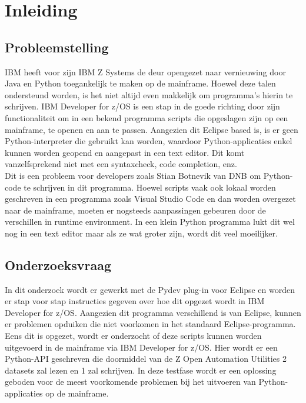 
\chapter{Inleiding}%
\label{ch:inleiding}

\section{Probleemstelling}%
\label{sec:probleemstelling}
IBM heeft voor zijn IBM Z Systems de deur opengezet naar vernieuwing door Java en Python toegankelijk te maken op de mainframe. Hoewel deze talen ondersteund worden, is het niet altijd even makkelijk om programma's hierin te schrijven. IBM Developer for z/OS is een stap in de goede richting door zijn functionaliteit om in een bekend programma scripts die opgeslagen zijn op een mainframe, te openen en aan te passen. Aangezien dit Eclipse based is, is er geen Python-interpreter die gebruikt kan worden, waardoor Python-applicaties enkel kunnen worden geopend en aangepast in een text editor. Dit komt vanzelfsprekend niet met een syntaxcheck, code completion, enz. \\ 

Dit is een probleem voor developers zoals Stian Botnevik van DNB om Python-code te schrijven in dit programma. Hoewel scripts vaak ook  lokaal worden geschreven in een programma zoals Visual Studio Code en dan worden overgezet naar de mainframe, moeten er nogsteeds aanpassingen gebeuren door de verschillen in runtime environment. In een klein Python programma lukt dit wel nog in een text editor maar als ze wat groter zijn, wordt dit veel moeilijker.


\section{Onderzoeksvraag}%
\label{sec:onderzoeksvraag}
In dit onderzoek wordt er gewerkt met de Pydev plug-in voor Eclipse en worden er stap voor stap instructies gegeven over hoe dit opgezet wordt in IBM Developer for z/OS. Aangezien dit programma verschillend is van Eclipse, kunnen er problemen opduiken die niet voorkomen in het standaard Eclipse-programma. \\

Eens dit is opgezet, wordt er onderzocht of deze scripts kunnen worden uitgevoerd in de mainframe via IBM Developer for z/OS. Hier wordt er een Python-API geschreven die doormiddel van de Z Open Automation Utilities 2 datasets zal lezen en 1 zal schrijven. In deze testfase wordt er een oplossing geboden voor de meest voorkomende problemen bij het uitvoeren van Python-applicaties op de mainframe.


